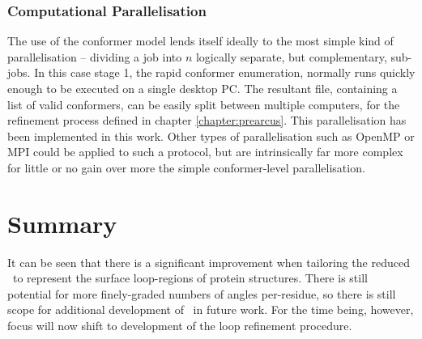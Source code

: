 \subsubsection{Computational Parallelisation}

The use of the conformer model lends itself ideally to the most simple kind of parallelisation -- dividing a job into $n$ logically separate, but complementary, sub-jobs. In this case stage 1, the rapid conformer enumeration, normally runs quickly enough to be executed on a single desktop PC. The resultant file, containing a list of valid conformers, can be easily
split between multiple computers, for the refinement process defined in chapter \ref{chapter:prearcus}. This parallelisation has been implemented in this work.
Other types of parallelisation
such as OpenMP or MPI could be applied to such a protocol, but are intrinsically far more complex for little or no gain over more the simple conformer-level parallelisation.


\section{Summary}

It can be seen that there is a significant improvement when tailoring the reduced \angleset\ to represent the surface loop-regions of protein structures. There is still potential for more finely-graded numbers of angles per-residue, so there is still scope for additional development of \anglesets\ in future work. For the time being, however, focus will now shift to development of the loop refinement procedure.

 

